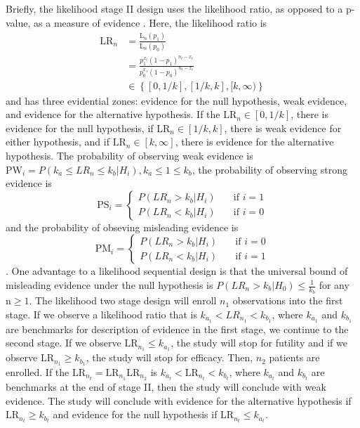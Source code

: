 \documentclass[12pt]{report}\usepackage[]{graphicx}\usepackage[]{color}
\newlength{\li}\setlength{\li}{14.48pt}
\newlength{\di}\setlength{\di}{-3.5mm}
\begin{document}
Briefly, the likelihood stage II design uses the likelihood ratio, as opposed to a p-value, as a measure of evidence \cite{Blume}. Here, the likelihood ratio is 
\begin{equation*}
\begin{aligned}
\mbox{LR}_n & = \frac{\mbox{L}_n(p_1)}{\mbox{L}_n(p_0)} \\
&= \frac{p_1^{x_t}(1-p_1)^{n_t-x_t}}{p_0^{x_1}(1-p_0)^{n_t-x_t}} \\
& \in \left\{[0, 1/k], [1/k,k], [k, \infty)\right\}
\end{aligned}
\end{equation*}
and has three evidential zones: evidence for the null hypothesis, weak evidence, and evidence for the alternative hypothesis. If the $\mbox{LR}_n \in [0, 1/k]$, there is evidence for the null hypothesis, if $\mbox{LR}_n \in [1/k,k]$, there is weak evidence for either hypothesis, and if $\mbox{LR}_n \in [k,\infty]$, there is evidence for the alternative hypothesis. The probability of observing weak evidence is $\mbox{PW}_i = P(k_a \leq LR_n \leq k_b | H_i), k_a \leq 1 \leq k_b$, the probability of observing strong evidence is 
$$
\mbox{PS}_i = \left\{
        \begin{array}{ll}
            P(LR_n > k_b|H_i) & \quad \text{if } i = 1 \\
            P(LR_n < k_b|H_i) & \quad \text{if } i = 0
        \end{array}
    \right.
$$
and the probability of obseving misleading evidence is 
$$
\mbox{PM}_i = \left\{
        \begin{array}{ll}
            P(LR_n > k_b|H_i) & \quad \text{if } i = 0 \\
            P(LR_n < k_b|H_i) & \quad \text{if } i = 1
        \end{array}
    \right.
$$. 
One advantage to a likelihood sequential design is that the universal bound of misleading evidence under the null hypothesis is $P(LR_n > k_b|H_0) \leq \frac{1}{k_b}$ for any $\mbox{n} \geq 1$.
The likelihood two stage design will enroll $n_1$ observations into the first stage. If we observe a likelihood ratio that is $k_{a_1} < LR_{n_1} < k_{b_1}$, where $k_{a_1}$ and $k_{b_1}$ are benchmarks for description of evidence in the first stage, we continue to the second stage. If we observe $\mbox{LR}_{n_1} \leq k_{a_1}$, the study will stop for futility and if we observe $\mbox{LR}_{n_1} \geq k_{b_1}$, the study will stop for efficacy. Then, $n_2$ patients are enrolled. If the $\mbox{LR}_{n_t} = \mbox{LR}_{n_1}\mbox{LR}_{n_2}$ is $k_{a_t} < \mbox{LR}_{n_t} < k_{b_t}$, where $k_{a_t}$ and $k_{b_t}$ are benchmarks at the end of stage II, then the study will conclude with weak evidence. The study will conclude with evidence for the alternative hypothesis if $\mbox{LR}_{n_t} \geq k_{b_t}$ and evidence for the null hypothesis if $\mbox{LR}_{n_t} \leq k_{a_t}$. \\
\end{document}
